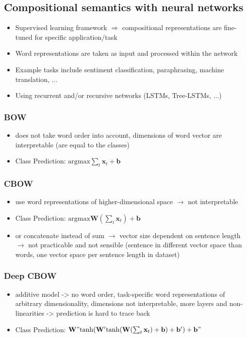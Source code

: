 \subsection{Compositional semantics with neural networks}
\begin{itemize}
	\item Supervised learning framework $\Rightarrow$ compositional representations are fine-tuned for specific application/task
	\item Word representations are taken as input and processed within the network
	\item Example tasks include sentiment classification, paraphrasing, machine translation, ...
	\item Using recurrent and/or recursive networks (LSTMs, Tree-LSTMs, ...)
\end{itemize}
\subsubsection{BOW}
\begin{itemize}
	\item does not take word order into account, dimensions of word vector are interpretable (are equal to the classes)
	\item Class Prediction: $\mathrm{argmax} \sum_t \mathbf{x}_t + \mathbf{b}$
\end{itemize}
\subsubsection{CBOW}
\begin{itemize}
	\item use word representations of higher-dimensional space $\rightarrow$ not interpretable
	\item Class Prediction: $\mathrm{argmax} \mathbf{W} (\sum_t \mathbf{x}_t) + \mathbf{b}$
	\item or concatenate instead of sum $\rightarrow$ vector size dependent on sentence length $\rightarrow$ not practicable and not sensible (sentence in different vector space than words, one vector space per sentence length in dataset)
\end{itemize}
\subsubsection{Deep CBOW}
\begin{itemize}
	\item additive model -> no word order, task-specific word representations of arbitrary dimensionality, dimensions not interpretable, more layers and non-linearities -> prediction is hard to trace back
	\item Class Prediction: $\mathbf{W"} \mathrm{tanh}(\mathbf{W'} \mathrm{tanh}(\mathbf{W} (\sum_t \mathbf{x}_t) + \mathbf{b}) + \mathbf{b'}) + \mathbf{b"}$
\end{itemize}

